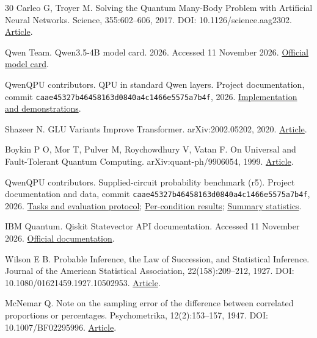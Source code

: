 \documentclass[11pt,a4paper]{article}
\begin{document}
\begin{thebibliography}{30}
Carleo G, Troyer M. Solving the Quantum Many-Body Problem with Artificial Neural Networks. Science, 355:602--606, 2017. DOI: 10.1126/science.aag2302. \href{https://arxiv.org/abs/1606.02318}{Article}.

Qwen Team. Qwen3.5-4B model card. 2026. Accessed 11 November 2026. \href{https://huggingface.co/Qwen/Qwen3.5-4B}{Official model card}.

QwenQPU contributors. QPU in standard Qwen layers. Project documentation, commit \texttt{caae4532\allowbreak{}7b464581\allowbreak{}63d0840a\allowbreak{}4c1466e5\allowbreak{}575a7b4f}, 2026. \href{https://github.com/xi-zhao/QwenQPU/blob/caae45327b46458163d0840a4c1466e5575a7b4f/docs/ADDED_LAYERS.md}{Implementation and demonstrations}.

Shazeer N. GLU Variants Improve Transformer. arXiv:2002.05202, 2020. \href{https://arxiv.org/abs/2002.05202}{Article}.

Boykin P O, Mor T, Pulver M, Roychowdhury V, Vatan F. On Universal and Fault-Tolerant Quantum Computing. arXiv:quant-ph/9906054, 1999. \href{https://arxiv.org/abs/quant-ph/9906054}{Article}.

QwenQPU contributors. Supplied-circuit probability benchmark (r5). Project documentation and data, commit \texttt{caae4532\allowbreak{}7b464581\allowbreak{}63d0840a\allowbreak{}4c1466e5\allowbreak{}575a7b4f}, 2026. \href{https://github.com/xi-zhao/QwenQPU/blob/caae45327b46458163d0840a4c1466e5575a7b4f/docs/BENCHMARK_ADDED_LAYERS.md}{Tasks and evaluation protocol}; \href{https://github.com/xi-zhao/QwenQPU/blob/caae45327b46458163d0840a4c1466e5575a7b4f/evidence/added-layers/r5-plot-data.json}{Per-condition results}; \href{https://github.com/xi-zhao/QwenQPU/blob/caae45327b46458163d0840a4c1466e5575a7b4f/evidence/added-layers/r5-final.json}{Summary statistics}.

IBM Quantum. Qiskit Statevector API documentation. Accessed 11 November 2026. \href{https://quantum.cloud.ibm.com/docs/en/api/qiskit/qiskit.quantum_info.Statevector}{Official documentation}.

Wilson E B. Probable Inference, the Law of Succession, and Statistical Inference. Journal of the American Statistical Association, 22(158):209--212, 1927. DOI: 10.1080/01621459.1927.10502953. \href{https://www.tandfonline.com/doi/abs/10.1080/01621459.1927.10502953}{Article}.

McNemar Q. Note on the sampling error of the difference between correlated proportions or percentages. Psychometrika, 12(2):153--157, 1947. DOI: 10.1007/BF02295996. \href{https://link.springer.com/article/10.1007/BF02295996}{Article}.


\end{thebibliography}
\end{document}
